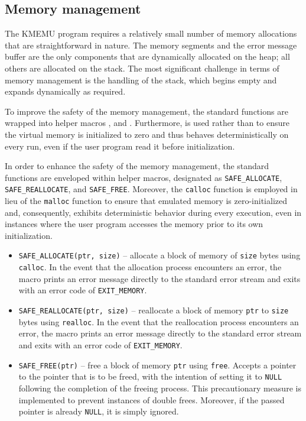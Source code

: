 \documentclass[10pt,a4paper,final]{article}
\newcommand{\code}[1]{\texttt{#1}}
\begin{document}
\subsection{Memory management}

The KMEMU program requires a relatively small number of memory allocations that
are straightforward in nature. The memory segments and the error message buffer
are the only components that are dynamically allocated on the heap; all others
are allocated on the stack. The most significant challenge in terms of memory
management is the handling of the stack, which begins empty and expands
dynamically as required.

To improve the safety of the memory management, the standard functions are
wrapped into helper macros ,  and
. Furthermore,  is used rather than
to ensure the virtual memory is initialized to zero and thus behaves
deterministically on every run, even if the user program read it before
initialization.

In order to enhance the safety of the memory management, the standard functions
are enveloped within helper macros, designated as \code{SAFE_ALLOCATE},
\code{SAFE_REALLOCATE}, and \code{SAFE_FREE}. Moreover, the \code{calloc}
function is employed in lieu of the \code{malloc} function to ensure that
emulated memory is zero-initialized and, consequently, exhibits deterministic
behavior during every execution, even in instances where the user program
accesses the memory prior to its own initialization.

\begin{itemize}
  \item \code{SAFE_ALLOCATE(ptr, size)} -- allocate a block of memory of
    \code{size} bytes using \code{calloc}. In the event that the allocation
    process encounters an error, the macro prints an error message directly
    to the standard error stream and exits with an error code of
    \code{EXIT_MEMORY}.
  \item \code{SAFE_REALLOCATE(ptr, size)} -- reallocate a block of memory
    \code{ptr} to \code{size} bytes using \code{realloc}. In the event that
    the reallocation process encounters an error, the macro prints an
    error message directly to the standard error stream and exits with an
    error code of \code{EXIT_MEMORY}.
  \item \code{SAFE_FREE(ptr)} -- free a block of memory \code{ptr} using
    \code{free}. Accepts a pointer to the pointer that is to be freed, with
    the intention of setting it to \code{NULL} following the completion of
    the freeing process. This precautionary measure is implemented to
    prevent instances of double frees. Moreover, if the passed pointer is
    already \code{NULL}, it is simply ignored.
\end{itemize}
\end{document}
